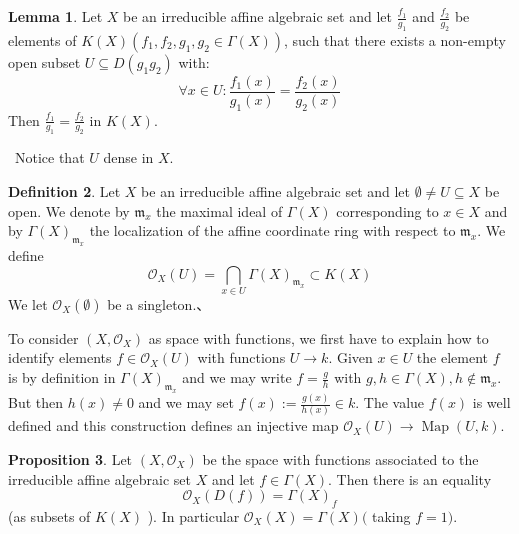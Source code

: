 \documentclass[12pt,a4paper]{book}
\newenvironment{prooff}{{\noindent\it\textcolor{cyan!40!black}{Proof}:}\,}{\par}
\theoremstyle{definition}
\newtheorem{defn}{Definition}[section]
\newtheorem{lem}[defn]{Lemma}
\newtheorem{prop}[defn]{Proposition}
\begin{document}
                                                                                                                                                                                                                                                                                                       
\begin{lem} 
    Let $X$ be an irreducible affine algebraic set and let $\frac{f_1}{g_1}$ and $\frac{f_2}{g_2}$ be elements of $K(X)\left(f_1, f_2, g_1, g_2 \in \Gamma(X)\right)$, such that there exists a non-empty open subset $U \subseteq D\left(g_1 g_2\right)$ with:
    $$
    \forall x \in U: \frac{f_1(x)}{g_1(x)}=\frac{f_2(x)}{g_2(x)}
    $$
    Then $\frac{f_1}{g_1}=\frac{f_2}{g_2}$ in $K(X)$.
\end{lem}
\begin{prooff}
    Notice that $U $ dense in $X$.
\end{prooff}
\begin{defn}
    Let $X$ be an irreducible affine algebraic set and let $\emptyset \neq U \subseteq X$ be open. We denote by $\mathfrak{m}_x$ the maximal ideal of $\Gamma(X)$ corresponding to $x \in X$ and by $\Gamma(X)_{\mathfrak{m}_x}$ the localization of the affine coordinate ring with respect to $\mathfrak{m}_x$. We define
    $$
    \mathscr{O}_X(U)=\bigcap_{x \in U} \Gamma(X)_{\mathfrak{m}_x} \subset K(X)
    $$
    We let $\mathscr{O}_X(\emptyset)$ be a singleton.、

    To consider $\left(X, \mathscr{O}_X\right)$ as space with functions, 
    we first have to explain how to identify elements 
    $f \in \mathscr{O}_X(U)$ with functions $U \rightarrow k$. 
    Given $x \in U$ the element $f$ is by definition in $\Gamma(X)_{\mathfrak{m}_x}$ and we may write $f=\frac{g}{h}$ with $g, h \in \Gamma(X), h \notin \mathfrak{m}_x$. But then $h(x) \neq 0$ and we may set $f(x):=\frac{g(x)}{h(x)} \in k$. The value $f(x)$ is well defined and this construction defines an injective map $\mathscr{O}_X(U) \rightarrow \operatorname{Map}(U, k)$.
\end{defn}
\begin{prop}
    Let $\left(X, \mathscr{O}_X\right)$ be the space with functions associated to the irreducible affine algebraic set $X$ and let $f \in \Gamma(X)$. Then there is an equality
    $$
    \mathscr{O}_X(D(f))=\Gamma(X)_f
    $$
    (as subsets of $K(X)$ ). In particular $\mathscr{O}_X(X)=\Gamma(X)($ taking $f=1)$.
\end{prop}
\end{document}
